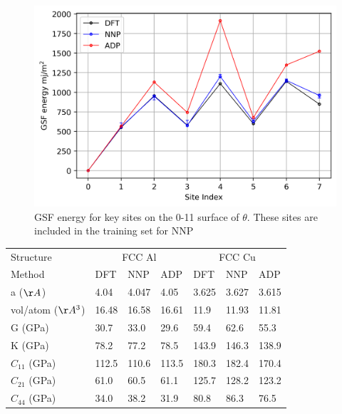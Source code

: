 \documentclass{article}
\begin{document}
\begin{figure}[H]%
\centering%
\includegraphics[width=540px]{./figures/NOTINOQMD_00001-GSF_0m11.png}%
\caption{GSF energy for key sites on the 0-11 surface of  $\theta$. These sites are included in the training set for NNP}%
\end{figure}


\begin{tabular}{l|lll|lll}%
\hline%
Structure&\multicolumn{3}{c}{FCC Al}&\multicolumn{3}{c}{FCC Cu}\\%
Method&DFT&NNP&ADP&DFT&NNP&ADP\\%
\hline%
a ($\AA$)&4.04&4.047&4.05&3.625&3.627&3.615\\%
vol/atom ($\AA^3$)&16.48&16.58&16.61&11.9&11.93&11.81\\%
G (GPa)&30.7&33.0&29.6&59.4&62.6&55.3\\%
K (GPa)&78.2&77.2&78.5&143.9&146.3&138.9\\%
$C_{11}$ (GPa)&112.5&110.6&113.5&180.3&182.4&170.4\\%
$C_{21}$ (GPa)&61.0&60.5&61.1&125.7&128.2&123.2\\%
$C_{44}$ (GPa)&34.0&38.2&31.9&80.8&86.3&76.5\\%
\hline%
\end{tabular}%
\newline%
\newline%
\newline%
\newline%
\end{document}
